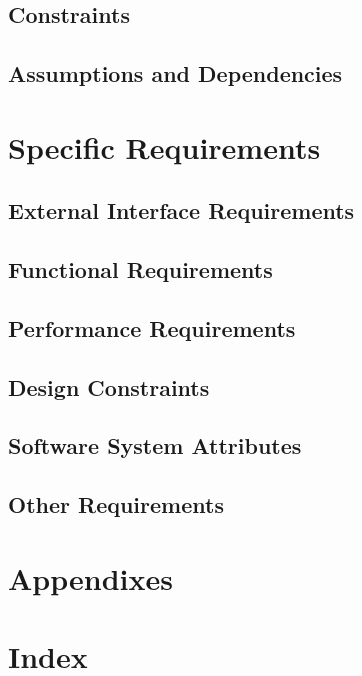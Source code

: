 \documentclass[a4paper,12pt]{article}
\begin{document}
        \subsection{Constraints}
        
        \subsection{Assumptions and Dependencies}
        
    \section{Specific Requirements}
    
    	\subsection{External Interface Requirements}
    	
        \subsection{Functional Requirements}
        
        \subsection{Performance Requirements}
        
        \subsection{Design Constraints}
        
        \subsection{Software System Attributes}
        
        \subsection{Other Requirements}
        
    \section{Appendixes}
    
    \section{Index}
    
    \pagebreak  
\end{document}
